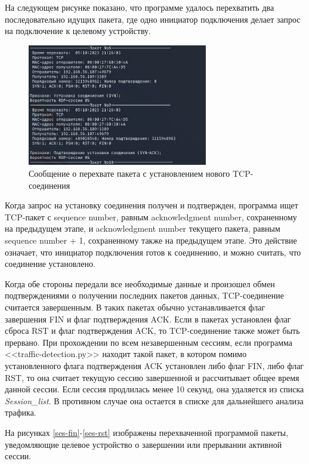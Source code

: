 \documentclass[bachelor, och, coursework]{SCWorks}
\begin{document}
На следующем рисунке показано, что программе удалось перехватить два последовательно идущих пакета, где одно инициатор подключения делает запрос на
подключение к целевому устройству.

\begin{figure}[H]
  \centering
  \includegraphics[width=0.7\textwidth]{photo/ses-syn.jpg}
  \caption{Сообщение о перехвате пакета с установлением нового TCP-соединения}
  \label{ses-syn}
\end{figure}


Когда запрос на установку соединения получен и подтвержден, программа ищет TCP-пакет с sequence number, равным acknowledgment number, 
сохраненному на предыдущем этапе, и acknowledgment number текущего пакета, равным sequence number + 1, сохраненному также на предыдущем 
этапе. Это действие означает, что инициатор подключения готов к соединению, и можно считать, что соединение установлено.


Когда обе стороны передали все необходимые данные и произошел обмен подтверждениями о получении последних пакетов данных, TCP-соединение считается 
завершенным. В таких пакетах обычно устанавливается флаг завершения FIN и флаг подтверждения ACK. Если в пакетах установлен флаг сброса RST и флаг 
подтверждения ACK, то TCP-соединение также может быть прервано. При прохождении по всем незавершенным сессиям, если программа <<traffic-detection.py>> 
находит такой пакет, в котором помимо установленного флага подтверждения ACK установлен либо флаг FIN, либо флаг RST, то она считает текущую сессию 
завершенной и рассчитывает общее время данной сессии. Если сессия продлилась менее 10 секунд, она удаляется из списка \textit{Session\_list}. В противном 
случае она остается в списке для дальнейшего анализа трафика.

На рисунках \ref{ses-fin}-\ref{ses-rst} изображены перехваченной программой пакеты, уведомляющие целевое устройство о завершении 
или прерывании активной сессии.
\end{document}
